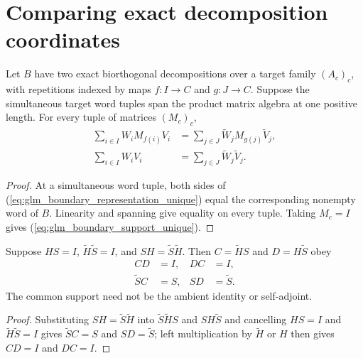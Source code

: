 \section{Comparing exact decomposition coordinates}
\label{sec:glm_boundary_comparison}

\begin{lemma}
    \label{thm:glm_boundary_representation_unique}
    \leanok
    Let $B$ have two exact biorthogonal decompositions over a target family
    $(A_c)_c$, with repetitions indexed by maps $f:I\to C$ and $g:J\to C$.
    Suppose the simultaneous target word tuples span the product matrix
    algebra at one positive length. For every tuple of matrices $(M_c)_c$,
    \begin{align}
        \sum_{i\in I}W_iM_{f(i)}V_i
         & =\sum_{j\in J}\widetilde W_jM_{g(j)}\widetilde V_j,
        \label{eq:glm_boundary_representation_unique}          \\
        \sum_{i\in I}W_iV_i
         & =\sum_{j\in J}\widetilde W_j\widetilde V_j.
        \label{eq:glm_boundary_support_unique}
    \end{align}
\end{lemma}
\begin{proof}
    \leanok
    At a simultaneous word tuple, both sides of
    (\ref{eq:glm_boundary_representation_unique}) equal the corresponding
    nonempty word of $B$. Linearity and spanning give equality on every
    tuple. Taking $M_c=I$ gives (\ref{eq:glm_boundary_support_unique}).
\end{proof}

\begin{lemma}
    \label{thm:glm_boundary_support_comparison}
    \leanok
    Suppose $HS=I$, $\widetilde H\widetilde S=I$, and
    $SH=\widetilde S\widetilde H$. Then
    $C=\widetilde HS$ and $D=H\widetilde S$ obey
    \begin{align}
        CD            & =I, & DC & =I,            \\
        \widetilde SC & =S, & SD & =\widetilde S.
        \label{eq:glm_boundary_support_comparison}
    \end{align}
    The common support need not be the ambient identity or self-adjoint.
\end{lemma}
\begin{proof}
    \leanok
    Substituting $SH=\widetilde S\widetilde H$ into
    $\widetilde S\widetilde HS$ and $SH\widetilde S$ and cancelling $HS=I$ and
    $\widetilde H\widetilde S=I$ gives $\widetilde SC=S$ and $SD=\widetilde S$;
    left multiplication by $\widetilde H$ or $H$ then gives $CD=I$ and $DC=I$.
\end{proof}

